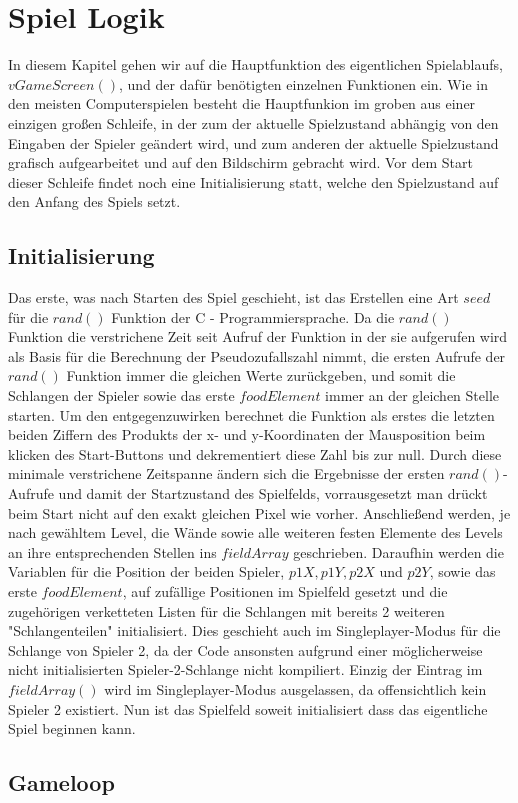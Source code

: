 
\chapter{Spiel Logik}
\label{Spiel_Logik}
%
In diesem Kapitel gehen wir auf die Hauptfunktion des eigentlichen Spielablaufs, $vGameScreen()$, und der dafür benötigten einzelnen Funktionen ein. Wie in den meisten Computerspielen besteht die Hauptfunkion im groben aus einer einzigen großen Schleife, in der zum der aktuelle Spielzustand abhängig von den Eingaben der Spieler geändert wird, und zum anderen der aktuelle Spielzustand grafisch aufgearbeitet und auf den Bildschirm gebracht wird. Vor dem Start dieser Schleife findet noch eine Initialisierung statt, welche den Spielzustand auf den Anfang des Spiels setzt.
%

\section{Initialisierung}
\label{Initialisierung}
%
Das erste, was nach Starten des Spiel geschieht, ist das Erstellen eine Art $seed$ für die $rand()$ Funktion der C - Programmiersprache. Da die $rand()$ Funktion die verstrichene Zeit seit Aufruf der Funktion in der sie aufgerufen wird als Basis für die Berechnung der Pseudozufallszahl nimmt, die ersten Aufrufe der $rand()$ Funktion immer die gleichen Werte zurückgeben, und somit die Schlangen der Spieler sowie das erste $foodElement$ immer an der gleichen Stelle starten. Um den entgegenzuwirken berechnet die Funktion als erstes die letzten beiden Ziffern des Produkts der x- und y-Koordinaten der Mausposition beim klicken des Start-Buttons und dekrementiert diese Zahl bis zur null. Durch diese minimale verstrichene Zeitspanne ändern sich die Ergebnisse der ersten $rand()$-Aufrufe und damit der Startzustand des Spielfelds, vorrausgesetzt man drückt beim Start nicht auf den exakt gleichen Pixel wie vorher.
Anschließend werden, je nach gewähltem Level, die Wände sowie alle weiteren festen Elemente des Levels an ihre entsprechenden Stellen ins $fieldArray$ geschrieben.
Daraufhin werden die Variablen für die Position der beiden Spieler, $p1X, p1Y, p2X$ und $p2Y$, sowie das erste $foodElement$, auf zufällige Positionen im Spielfeld gesetzt und die zugehörigen verketteten Listen für die Schlangen mit bereits 2 weiteren "Schlangenteilen" initialisiert. Dies geschieht auch im Singleplayer-Modus für die Schlange von Spieler 2, da der Code ansonsten aufgrund einer möglicherweise nicht initialisierten Spieler-2-Schlange nicht kompiliert. Einzig der Eintrag im $fieldArray()$  wird im Singleplayer-Modus ausgelassen, da offensichtlich kein Spieler 2 existiert.
Nun ist das Spielfeld soweit initialisiert dass das eigentliche Spiel beginnen kann.
%

\section{Gameloop}
\label{Gameloop}
%

%


   

%
